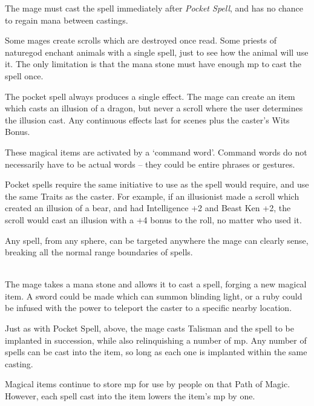 \begin{multicols}{2}
The mage must cast the spell immediately after \textit{Pocket Spell}, and has no chance to regain mana between castings.

Some mages create scrolls which are destroyed once read.  Some priests of \gls{naturegod} enchant animals with a single spell, just to see how the animal will use it.
The only limitation is that the mana stone must have enough \gls{mp} to cast the spell once.

The pocket spell always produces a single effect.
The mage can create an item which casts an illusion of a dragon, but never a scroll where the user determines the illusion cast.
Any continuous effects last for  scenes plus the caster's Wits Bonus.

These magical items are activated by a `command word'.
Command words do not necessarily have to be actual words -- they could be entire phrases or gestures.

Pocket spells require the same initiative to use as the spell would require, and use the same Traits as the caster.
For example, if an illusionist made a scroll which created an illusion of a bear, and had Intelligence +2 and Beast Ken +2, the scroll would cast an illusion with a +4 bonus to the roll, no matter who used it.

\spelllevel


Any spell, from any sphere, can be targeted anywhere the mage can clearly sense, breaking all the normal range boundaries of spells.

\spelllevel

\\
The mage takes a mana stone and allows it to cast a spell, forging a new magical item. A sword could be made which can summon blinding light, or a ruby could be infused with the power to teleport the caster to a specific nearby location.

Just as with Pocket Spell, above, the mage casts Talisman and the spell to be implanted in succession, while also relinquishing a number of \gls{mp}.
Any number of spells can be cast into the item, so long as each one is implanted within the same casting.

Magical items continue to store \gls{mp} for use by people on that Path of Magic.
However, each spell cast into the item lowers the item's \gls{mp} by one.


\end{multicols}
